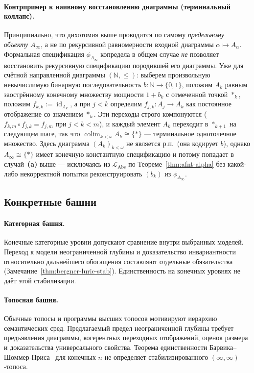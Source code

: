 \documentclass[11pt]{article}
\theoremstyle{plain}
\theoremstyle{definition}
\newcommand{\LAbs}{\mathcal{L}_{\mathrm{Abs}}}
\DeclareMathOperator{\colim}{colim}
\DeclareMathOperator{\id}{id}
\begin{document}
\paragraph{Контрпример к наивному восстановлению диаграммы (терминальный коллапс).}
Принципиально, что дихотомия выше проводится по самому \emph{предельному объекту} $A_\infty$, а не по рекурсивной равномерности входной диаграммы $\alpha \mapsto A_\alpha$. Формальная спецификация $\phi_{A_\infty}$ копредела в общем случае \emph{не} позволяет восстановить рекурсивную спецификацию породившей его диаграммы. Уже для счётной направленной диаграммы $(\mathbb{N}, \le)$: выберем произвольную невычислимую бинарную последовательность $b : \mathbb{N} \to \{0, 1\}$, положим $A_k$ равным заострённому конечному множеству мощности $1 + b_k$ с отмеченной точкой $*_k$, положим $f_{k,k} := \id_{A_k}$, а при $j < k$ определим $f_{j,k} : A_j \to A_k$ как постоянное отображение со значением $*_k$. Эти переходы строго компонуются ($f_{k,m} \circ f_{j,k} = f_{j,m}$ при $j < k < m$), и каждый элемент $A_k$ переходит в $*_{k+1}$ на следующем шаге, так что $\colim_{k < \omega} A_k \cong \{*\}$ — терминальное одноточечное множество. Здесь диаграмма $(A_k)_{k < \omega}$ не является р.п.\ (она кодирует $b$), однако $A_\infty \cong \{*\}$ имеет конечную константную спецификацию и потому попадает в случай~\textbf{(a)} выше — исключаясь из $\LAbs$ по Теореме~\ref{thm:afnt-alpha} без какой-либо некорректной попытки реконструировать $(b_k)$ из $\phi_{A_\infty}$.

\subsection{Конкретные башни}

\paragraph{Категорная башня.} Конечные категорные уровни допускают сравнение внутри выбранных моделей. Переход к модели неограниченной глубины и доказательство инвариантности относительно дальнейшего обогащения составляют отдельные обязательства (Замечание~\ref{thm:bergner-lurie-stab}). Единственность на конечных уровнях не даёт этой стабилизации.

\paragraph{Топосная башня.} Обычные топосы и программы высших топосов мотивируют иерархию семантических сред. Предлагаемый предел неограниченной глубины требует предъявления диаграммы, когерентных переходных отображений, оценок размера и доказательства универсального свойства. Теорема единственности Барвика--Шоммер-Приса~\cite{BarwickSchommerPries2021} для конечных $n$ не определяет стабилизированного $(\infty, \infty)$-топоса.
\end{document}
